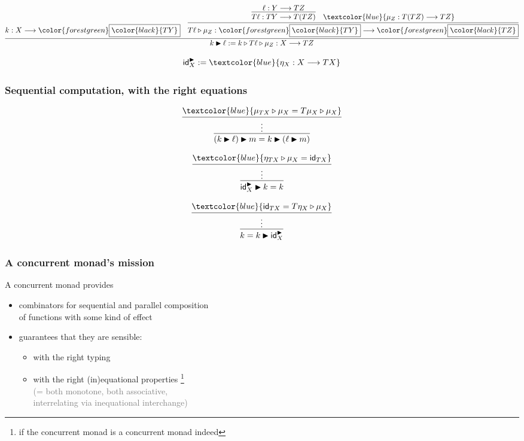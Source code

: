 \documentclass[aspectratio=169,11pt]{beamer}
\newcommand{\tto}{\longrightarrow}
\newcommand{\id}{\textsf{id}}
\newcommand{\seq}{\mathbin{\triangleright}}
\newcommand{\idK}{\mathsf{id}^{\tiny \blacktriangleright}}
\newcommand{\seqK}{\mathbin{\blacktriangleright}}
\newcommand{\greenb}[1]{{\color{forestgreen}\boxed{\color{black}{#1}}}}
\newcommand{\blue}[1]{\textcolor{blue}{#1}}
\newcommand{\gray}[1]{\textcolor{gray}{#1}}
\begin{document}
\begin{frame}

\[
  \infer{k \seqK \ell := k \seq T \ell \seq \mu_Z : X \tto T Z}{
    k : X \tto \greenb{T Y}
    &
    \infer{T \ell \seq \mu_Z  : \greenb{T Y} \tto \greenb{T Z}}{
       \infer{T \ell : T Y \tto T (T Z)}{
         \ell : Y \tto T Z
       }
       &
       \blue{\mu_Z : T (T Z) \tto T Z} 
    }   
  }  
\]

\[
  \idK_X := \blue{\eta_X : X \tto T X}
\]
  
\end{frame}


\begin{frame}

\frametitle{Sequential computation, with the right equations}


\[
  \infer{(k \seqK \ell) \seqK m = k \seqK (\ell \seqK m)}{
    \infer{\vdots}{
      \blue{\mu_{TX} \seq \mu_X = T \mu_X \seq \mu_X}
    }
  }  
\]  


\[
  \infer{\idK_X \seqK k = k}{
    \infer{\vdots}{
      \blue{\eta_{TX} \seq \mu_X = \id_{TX}}
    }
  } 
\]

\[
  \infer{k = k \seqK \idK_X}{
    \infer{\vdots}{
      \blue{\id_{TX} = T \eta_X \seq \mu_X}
    }
  } 
\]

\end{frame}  


\begin{frame}

\frametitle{A concurrent monad's mission}

 A concurrent monad provides

  \begin{itemize}

  \item combinators for sequential and parallel composition \\
    of functions with some kind of effect

  \item guarantees that they are sensible:

  \begin{itemize}

  \item with the right typing

  \item with the right (in)equational properties
    \footnote{if the concurrent monad is a concurrent monad indeed} \\
  \gray{(= both monotone, both associative, \\
  interrelating via inequational interchange)}

  \end{itemize}
  \end{itemize}

\end{frame}  
\end{document}
